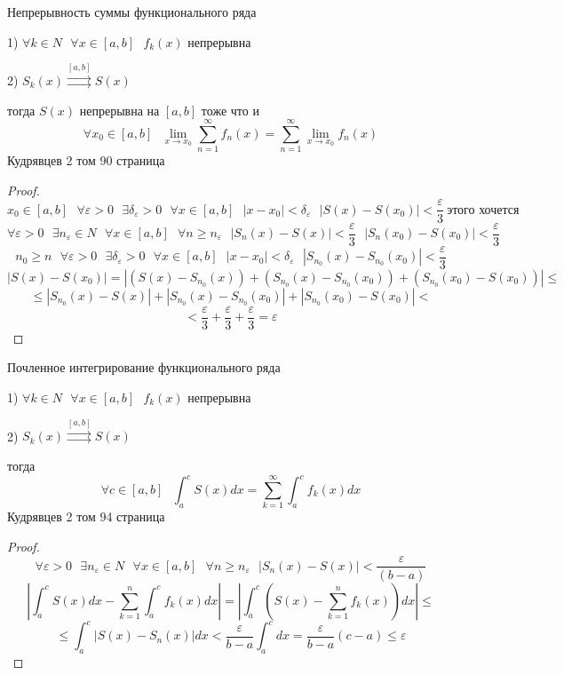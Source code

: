 \begin{title}[\Large]
  Непрерывность суммы функционального ряда
\end{title}

\begin{theorem}
  1) $\forall k \in N ~~~ \forall x \in [a,b] ~~~ f_k(x)$ непрерывна

  2) $S_k (x) \stackrel{[a,b]}{\rightrightarrows} S(x)$

  тогда $S(x)$ непрерывна на $[a,b]$ тоже что и
  $$
  \forall x_0 \in [a,b] ~~~
  \lim_{x \to x_0} \sum_{n=1}^{\infty} f_n (x) = \sum_{n=1}^{\infty}
  \lim_{x \to x_0} f_n(x)
  $$
  Кудрявцев 2 том 90 страница
\end{theorem}

\begin{proof}
  $$
  x_0 \in [a,b] ~~~ \forall \varepsilon > 0 ~~~ \exists \delta_{\varepsilon} > 0
   ~~~ \forall x \in [a,b] ~~~ |x - x_0| < \delta_{\varepsilon} ~~~
  |S(x) - S(x_0)| < \frac{\varepsilon}{3} ~ \text{этого хочется}
  $$
  $$
  \forall \varepsilon > 0 ~~~ \exists n_{\varepsilon} \in N ~~~
  \forall x \in [a,b] ~~~ \forall n \ge n_{\varepsilon} ~~~ |S_n(x) - S(x)| <
  \frac{\varepsilon}{3} ~~~ |S_n(x_0) - S(x_0)| < \frac{\varepsilon}{3}
  $$
  $$
  n_0 \ge n ~~~ \forall \varepsilon > 0
  ~~~ \exists \delta_{\varepsilon} > 0 ~~~ \forall x \in [a,b] ~~~ |x - x_0| <
  \delta_{\varepsilon} ~~~ |S_{n_0}(x) - S_{n_0}(x_0)| < \frac{\varepsilon}{3}
  $$
  $$
  |S(x) - S(x_0)| =  |(S(x) - S_{n_0}(x)) + (S_{n_0}(x) - S_{n_0}(x_0))
  + (S_{n_0}(x_0) - S(x_0))| \le
  $$
  $$
   \le |S_{n_0}(x) - S(x)| +
  |S_{n_0}(x) - S_{n_0}(x_0)| + |S_{n_0}(x_0) - S(x_0)| <
  $$
  $$
  < \frac{\varepsilon}{3} +
  \frac{\varepsilon}{3} + \frac{\varepsilon}{3} = \varepsilon
  $$
\end{proof}

\begin{title}[\Large]
  Почленное интегрирование функционального ряда
\end{title}

\begin{theorem}
  1) $\forall k \in N ~~~ \forall x \in [a,b] ~~~ f_k(x)$ непрерывна

  2) $S_k(x) \stackrel{[a,b]}{\rightrightarrows} S(x)$

  тогда
  $$
  \forall c \in [a,b] ~~~ \int_a^c S(x)dx =
  \sum_{k=1}^{\infty} \int_a^c f_k(x)dx
  $$
  Кудрявцев 2 том 94 страница
\end{theorem}

\begin{proof}
  $$
  \forall \varepsilon  > 0 ~~~ \exists n_{\varepsilon} \in N ~~~
  \forall x \in[a,b] ~~~ \forall n \ge n_{\varepsilon} ~~~
  |S_n(x) - S(x)| < \frac{\varepsilon}{(b-a)}
  $$
  $$
  \left| \int_a^c S(x)dx - \sum_{k=1}^n \int_a^c f_k(x)dx \right| =
  \left| \int_a^c \left( S(x) - \sum_{k=1}^n f_k(x) \right)dx \right| \le
  $$
  $$
  \le \int_a^c |S(x) - S_n(x)|dx < \frac{\varepsilon}{b-a} \int_a^c dx =
  \frac{\varepsilon}{b-a}(c-a) \le \varepsilon
  $$
\end{proof}

